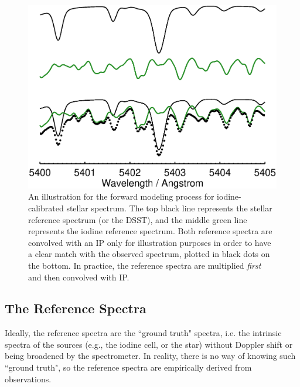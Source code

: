 \begin{figure}
\includegraphics[scale=0.6]{doppler/forward_modeling.eps}
\caption{An illustration for the forward modeling process for
  iodine-calibrated stellar spectrum. The top black line represents
  the stellar reference spectrum (or the DSST), and the middle green line
  represents the iodine reference spectrum. Both reference spectra are
  convolved with an IP only for illustration purposes in order to have
  a clear match with the observed spectrum, plotted in black dots on
  the bottom. In practice, the reference spectra are multiplied {\it
    first} and then convolved with IP. \label{doppler:fig:modeling}}
\end{figure}



\subsection{The Reference Spectra}\label{doppler:sec:reference}

Ideally, the reference spectra are the ``ground truth" spectra,
i.e. the intrinsic spectra of the sources (e.g., the iodine cell, or
the star) without Doppler shift or being broadened by the
spectrometer. In reality, there is no way of knowing such ``ground
truth", so the reference spectra are empirically derived from
observations.


